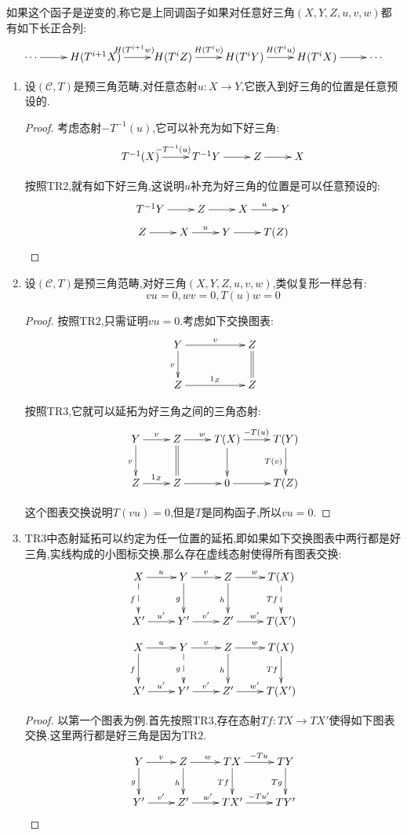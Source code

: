 \begin{enumerate}
    如果这个函子是逆变的,称它是上同调函子如果对任意好三角$(X,Y,Z,u,v,w)$都有如下长正合列:
    $$\xymatrix{\cdots\ar[r]&H(T^{i+1}X)\ar[r]^{H(T^{i+1}w)}&H(T^iZ)\ar[r]^{H(T^iv)}&H(T^iY)\ar[r]^{H(T^iu)}&H(T^iX)\ar[r]&\cdots}$$
\end{enumerate}
\begin{enumerate}
	\item 设$(\mathscr{C},T)$是预三角范畴,对任意态射$u:X\to Y$,它嵌入到好三角的位置是任意预设的.
	\begin{proof}
		
		考虑态射$-T^{-1}(u)$,它可以补充为如下好三角:
		$$\xymatrix{T^{-1}(X)\ar[r]^{-T^{-1}(u)}&T^{-1}Y\ar[r]&Z\ar[r]&X}$$
		
		按照$\mathrm{TR}2$,就有如下好三角,这说明$u$补充为好三角的位置是可以任意预设的:
		$$\xymatrix{T^{-1}Y\ar[r]&Z\ar[r]&X\ar[r]^u&Y}$$
		$$\xymatrix{Z\ar[r]&X\ar[r]^u&Y\ar[r]&T(Z)}$$
	\end{proof}
    \item 设$(\mathscr{C},T)$是预三角范畴,对好三角$(X,Y,Z,u,v,w)$,类似复形一样总有:
    $$vu=0,wv=0,T(u)w=0$$
    \begin{proof}
    	
    	按照$\mathrm{TR}2$,只需证明$vu=0$.考虑如下交换图表:
    	$$\xymatrix{Y\ar[rr]^v\ar[d]_v&&Z\ar@{=}[d]\\Z\ar[rr]^{1_Z}&&Z}$$
    	
    	按照$\mathrm{TR}3$,它就可以延拓为好三角之间的三角态射:
    	$$\xymatrix{Y\ar[r]^v\ar[d]_v&Z\ar[r]^w\ar@{=}[d]&T(X)\ar[r]^{-T(u)}\ar[d]&T(Y)\ar[d]_{T(v)}\\Z\ar[r]^{1_Z}&Z\ar[r]&0\ar[r]&T(Z)}$$
    	
    	这个图表交换说明$T(vu)=0$,但是$T$是同构函子,所以$vu=0$.
    \end{proof}
    \item $\mathrm{TR}3$中态射延拓可以约定为任一位置的延拓,即如果如下交换图表中两行都是好三角,实线构成的小图标交换,那么存在虚线态射使得所有图表交换:
    $$\xymatrix{X\ar[r]^u\ar@{-->}[d]_f&Y\ar[r]^v\ar[d]_g&Z\ar[r]^w\ar[d]_h&T(X)\ar@{-->}[d]_{Tf}\\X'\ar[r]^{u'}&Y'\ar[r]^{v'}&Z'\ar[r]^{w'}&T(X')}$$
    $$\xymatrix{X\ar[r]^u\ar[d]_f&Y\ar[r]^v\ar@{-->}[d]_g&Z\ar[r]^w\ar[d]_h&T(X)\ar[d]_{Tf}\\X'\ar[r]^{u'}&Y'\ar[r]^{v'}&Z'\ar[r]^{w'}&T(X')}$$
    \begin{proof}
    	
    	以第一个图表为例.首先按照$\mathrm{TR}3$,存在态射$Tf:TX\to TX'$使得如下图表交换.这里两行都是好三角是因为$\mathrm{TR}2$.
    	$$\xymatrix{Y\ar[r]^v\ar[d]_g&Z\ar[r]^w\ar[d]_h&TX\ar[r]^{-Tu}\ar[d]_{Tf}&TY\ar[d]_{Tg}\\Y'\ar[r]^{v'}&Z'\ar[r]^{w'}&TX'\ar[r]^{-Tu'}&TY'}$$
    	

\end{proof}
\end{enumerate}
